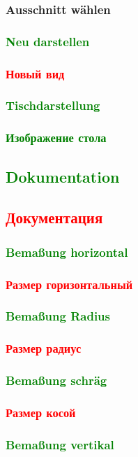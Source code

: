 \documentclass[14pt,a4paper]{book}
\newcommand{\DE}[1]{\textcolor{green}{#1}}
\newcommand{\RU}[1]{\textcolor{red}{#1}}
\begin{document}
			\subsubsection{Ausschnitt wählen} 
			\DE{\subsubsection{Neu darstellen}} 
			\RU{\subsubsection{Новый вид}} 
			\DE{\subsubsection{Tischdarstellung}}
			\DE{\subsubsection{Изображение стола}}
		\DE{\subsection{Dokumentation}}
		\RU{\subsection{Документация}}
			\DE{\subsubsection{Bemaßung horizontal}}
			\RU{\subsubsection{Размер горизонтальный}}
			\DE{\subsubsection{Bemaßung Radius}}
			\RU{\subsubsection{Размер радиус}}
			\DE{\subsubsection{Bemaßung schräg}}
			\RU{\subsubsection{Размер косой}}
			\DE{\subsubsection{Bemaßung vertikal}}
\end{document}
